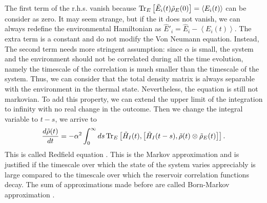 The first term of the r.h.s. vanish because $ \operatorname{Tr}_E\left[\tilde E_i(t)\tilde\rho_E(0)\right] = \left<E_i(t)\right>$ can be consider as zero. 
It may seem strange, but if the it does not vanish, we can always redefine the environmental Hamiltonian as $\hat E'_i = \hat E_i - \left<E_i(t)\right>$. The extra term is a constant and do not modify the Von Neumann equation.
Instead, The second term needs more stringent assumption: since $\alpha$ is small, the system and the environment should not be correlated during all the time evolution, namely the timescale of the correlation is much smaller than the timescale of the system. Thus, we can consider that the total density matrix is always separable with the environment in the thermal state.
Nevertheless, the equation is still not markovian. To add this property, we can extend the upper limit of the integration to infinity with no real change in the outcome. Then we change the integral variable to $t - s$, we arrive to 
\begin{eqnarray}\label{C_markovian}
    \frac{d\tilde \rho(t)}{dt} = -\alpha^2 \int_0^\infty ds \operatorname{Tr}_E\left[\tilde H_I(t),\left[\tilde H_I(t-s),\tilde\rho(t)\otimes\tilde\rho_E(t)\right]\right].
\end{eqnarray}
This is called Redfield equation \cite{Redfield}.
This is the Markov approximation and is justified if the timescale over which the state of the system varies appreciably is large compared to the timescale over which the reservoir correlation functions decay. The sum of approximations made before are called Born-Markov approximation \cite{Breuer-Petruccione}.


